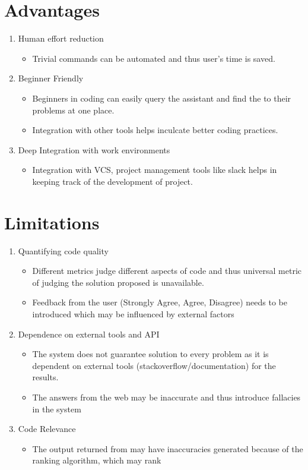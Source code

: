 \documentclass[oneside,a4paper,12pt, times]{book}
\begin{document}
\section{Advantages}
\begin{enumerate}
    \item Human effort reduction
    \begin{itemize}
        \item Trivial commands can be automated and thus user's time is saved. 
    \end{itemize}
    
    \item Beginner Friendly
    \begin{itemize}
        \item Beginners in coding can easily query the assistant and find the to their problems at one place.
        \item Integration with other tools helps inculcate better coding practices.
    \end{itemize}
    \item Deep Integration with work environments
    \begin{itemize}
        \item Integration with VCS, project management tools like slack helps in keeping track of the development of project. 
    \end{itemize}
\end{enumerate}

\section{Limitations}
\begin{enumerate}
   
    \item Quantifying code quality
    \begin{itemize}
        \item Different metrics judge different aspects of code and thus universal metric of judging the solution proposed is unavailable.
        \item Feedback from the user (Strongly Agree, Agree, Disagree) needs to be introduced which may be influenced by external factors
    \end{itemize}
    \item Dependence on external tools and API
    \begin{itemize}
        \item The system does not guarantee solution to every problem as it is dependent on external tools (stackoverflow/documentation) for the results.
        \item The answers from the web may be inaccurate and thus introduce fallacies in the system
    \end{itemize}
     \item Code Relevance
    \begin{itemize}
        \item The output returned from may have inaccuracies generated because of the ranking algorithm, which may rank 
    \end{itemize}
\end{enumerate}
\end{document}
